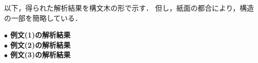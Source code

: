 以下，得られた解析結果を構文木の形で示す．
但し，紙面の都合により，構造の一部を簡略している．

\begin{flushleft}
  \thicklines
  \bf $\bullet$ 例文(1)の解析結果\\[2mm]
  

  \bf $\bullet$ 例文(2)の解析結果\\[2mm]
  

\newpage
  \bf $\bullet$ 例文(3)の解析結果\\[2mm]
  
\end{flushleft}

\newpage
\thispagestyle{plain}
\
\newpage
\thispagestyle{plain}
\



